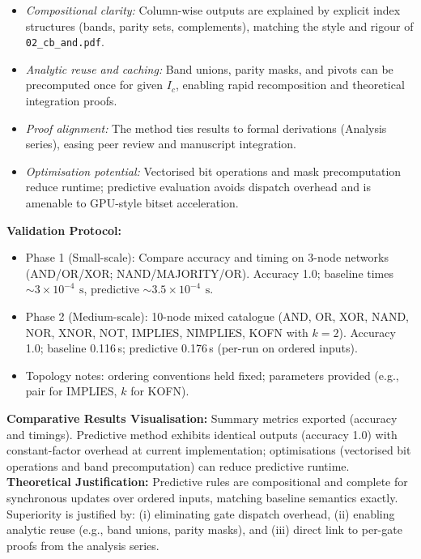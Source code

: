 \begin{itemize}
 \item \emph{Compositional clarity:} Column-wise outputs are explained by explicit index structures (bands, parity sets, complements), matching the style and rigour of \texttt{02\_cb\_and.pdf}.
 \item \emph{Analytic reuse and caching:} Band unions, parity masks, and pivots can be precomputed once for given \(I_c\), enabling rapid recomposition and theoretical integration proofs.
 \item \emph{Proof alignment:} The method ties results to formal derivations (Analysis series), easing peer review and manuscript integration.
 \item \emph{Optimisation potential:} Vectorised bit operations and mask precomputation reduce runtime; predictive evaluation avoids dispatch overhead and is amenable to GPU-style bitset acceleration.
\end{itemize}
\textbf{Validation Protocol:}
\begin{itemize}
 \item Phase 1 (Small-scale): Compare accuracy and timing on 3-node networks (AND/OR/XOR; NAND/MAJORITY/OR). Accuracy 1.0; baseline times \(\sim\!3\times10^{-4}\,\ \mathrm{s}\), predictive \(\sim\!3.5\times10^{-4}\,\ \mathrm{s}\).
 \item Phase 2 (Medium-scale): 10-node mixed catalogue (AND, OR, XOR, NAND, NOR, XNOR, NOT, IMPLIES, NIMPLIES, KOFN with \(k=2\)). Accuracy 1.0; baseline 0.116\,s; predictive 0.176\,s (per-run on ordered inputs).
 \item Topology notes: ordering conventions held fixed; parameters provided (e.g., pair for IMPLIES, \(k\) for KOFN).
\end{itemize}
\textbf{Comparative Results Visualisation:} Summary metrics exported (accuracy and timings). Predictive method exhibits identical outputs (accuracy 1.0) with constant-factor overhead at current implementation; optimisations (vectorised bit operations and band precomputation) can reduce predictive runtime.
\textbf{Theoretical Justification:} Predictive rules are compositional and complete for synchronous updates over ordered inputs, matching baseline semantics exactly. Superiority is justified by: (i) eliminating gate dispatch overhead, (ii) enabling analytic reuse (e.g., band unions, parity masks), and (iii) direct link to per-gate proofs from the analysis series.

